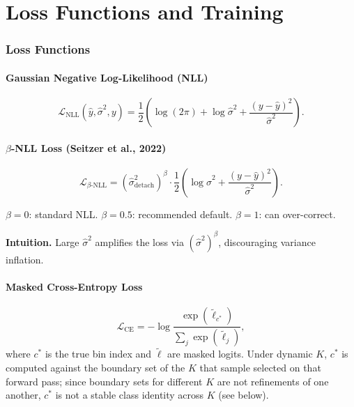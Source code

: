 \documentclass[11pt,a4paper]{article}
\theoremstyle{definition}
\begin{document}
\part{Loss Functions and Training}

\section{Loss Functions}
\label{sec:losses}

\subsection{Gaussian Negative Log-Likelihood (NLL)}
\label{sec:nll}

\begin{equation}
  \mathcal{L}_{\mathrm{NLL}}(\hat{y}, \hat{\sigma}^2, y) =
  \frac{1}{2}\left(\log(2\pi) + \log\hat{\sigma}^2 + \frac{(y - \hat{y})^2}{\hat{\sigma}^2}\right).
  \label{eq:nll}
\end{equation}

\subsection{$\beta$-NLL Loss (Seitzer et al., 2022)}

\begin{equation}
  \mathcal{L}_{\beta\text{-NLL}} =
  \left(\hat{\sigma}^2_{\mathrm{detach}}\right)^\beta \cdot
  \frac{1}{2}\left(\log\hat{\sigma}^2 + \frac{(y - \hat{y})^2}{\hat{\sigma}^2}\right).
  \label{eq:beta_nll}
\end{equation}

$\beta = 0$: standard NLL. $\beta = 0.5$: recommended default.
$\beta = 1$: can over-correct.

\textbf{Intuition.} Large $\hat{\sigma}^2$ amplifies the loss via
$(\hat{\sigma}^2)^\beta$, discouraging variance inflation.

\subsection{Masked Cross-Entropy Loss}

\[
  \mathcal{L}_{\mathrm{CE}} = -\log\frac{\exp(\tilde{\ell}_{c^*})}{\sum_{j} \exp(\tilde{\ell}_j)},
\]
where $c^*$ is the true bin index and $\tilde{\ell}$ are masked logits. Under dynamic $K$,
$c^*$ is computed against the boundary set of the $K$ that sample selected on that forward
pass; since boundary sets for different $K$ are not refinements of one another, $c^*$ is not a
stable class identity across $K$ (see below).
\end{document}
